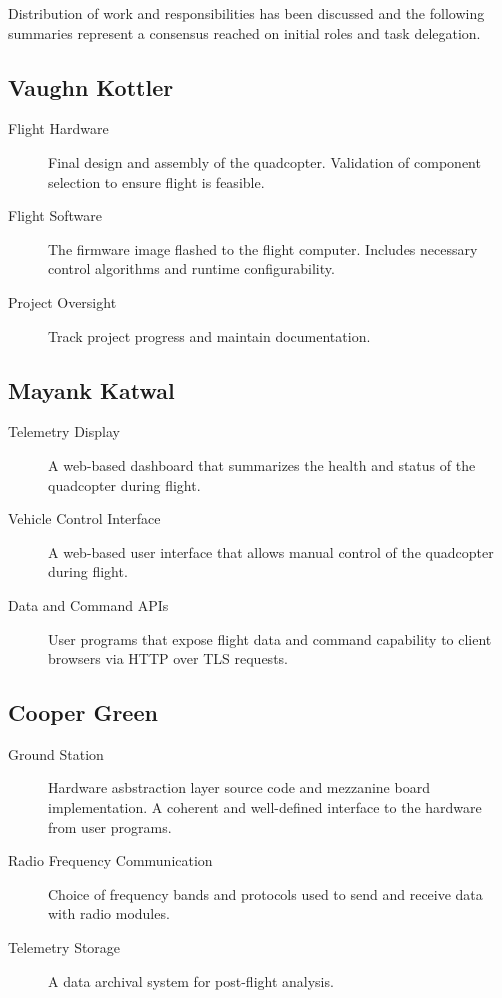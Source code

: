 \documentclass{article}
\begin{document}
\noindent Distribution of work and responsibilities has been discussed and the
following summaries represent a consensus reached on initial roles and task
delegation.

\subsection{Vaughn Kottler}

\begin{description}
	\item [Flight Hardware] Final design and assembly of the quadcopter.
		Validation of component selection to ensure flight is feasible.
	\item [Flight Software] The firmware image flashed to the flight
		computer. Includes necessary control algorithms and runtime
		configurability.
	\item [Project Oversight] Track project progress and maintain
		documentation.
\end{description}

\subsection{Mayank Katwal}

\begin{description}
	\item [Telemetry Display] A web-based dashboard that summarizes the health
		and status of the quadcopter during flight.
	\item [Vehicle Control Interface] A web-based user interface that allows
		manual control of the quadcopter during flight.
	\item [Data and Command APIs] User programs that expose flight data
		and command capability to client browsers via HTTP over TLS requests.
\end{description}

\subsection{Cooper Green}

\begin{description}
	\item [Ground Station] Hardware asbstraction layer source code and
		mezzanine board implementation. A coherent and well-defined interface
		to the hardware from user programs.
	\item [Radio Frequency Communication] Choice of frequency bands and
		protocols used to send and receive data with radio modules.
	\item [Telemetry Storage] A data archival system for post-flight analysis.
\end{description}
\end{document}
